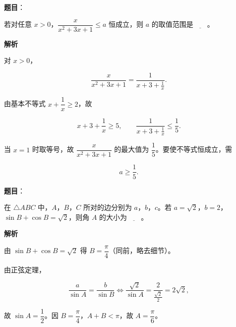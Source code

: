 \begin{answer}

\textbf{题目}：

若对任意 $x>0$，$\dfrac{x}{x^2+3x+1}\leqslant a$ 恒成立，则 $a$ 的取值范围是$\underline{\qquad}$。

\textbf{解析}

对 $x>0$，

\nopagebreak[4]
\[\frac{x}{x^2+3x+1}=\frac1{x+3+\frac1x}.\]

由基本不等式 $x+\dfrac1x\geqslant2$，故

\nopagebreak[4]
\[x+3+\frac1x\geqslant5,\qquad \frac1{x+3+\frac1x}\leqslant\frac15.\]

当 $x=1$ 时取等号，故 $\dfrac{x}{x^2+3x+1}$ 的最大值为 $\dfrac15$。要使不等式恒成立，需

\nopagebreak[4]
\[a\geqslant\frac15.\]

\gkanswer{答案：$\left[\dfrac15,+\infty\right)$。}

\end{answer}
\begin{answer}

\textbf{题目}：

在 $\triangle ABC$ 中，$A$，$B$，$C$ 所对的边分别为 $a$，$b$，$c$。若 $a=\sqrt2$，$b=2$，$\sin B+\cos B=\sqrt2$，则角 $A$ 的大小为$\underline{\qquad}$。

\textbf{解析}

由 $\sin B+\cos B=\sqrt2$ 得 $B=\dfrac\pi4$（同前，略去细节）。

由正弦定理，

\nopagebreak[4]
\[\frac a{\sin A}=\frac b{\sin B}
\iff \frac{\sqrt2}{\sin A}=\frac2{\frac{\sqrt2}2}=2\sqrt2,\]

故 $\sin A=\dfrac12$。因 $B=\dfrac\pi4$，$A+B<\pi$，故 $A=\dfrac\pi6$。


\end{answer}
